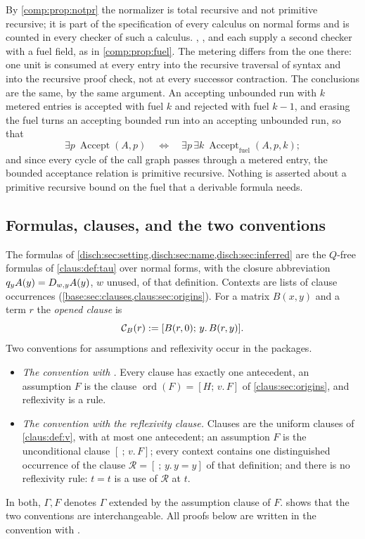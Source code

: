 \begin{remark}
\label{disch:rem:fuel}
By \cref{comp:prop:notpr} the normalizer is total recursive and not
primitive recursive; it is part of the specification of every calculus on
normal forms and is counted in every checker of such a calculus.
, , 
and  each supply a second checker with a fuel
field, as in \cref{comp:prop:fuel}. The metering differs from the one
there: one unit is consumed at every entry into the recursive traversal of
syntax and into the recursive proof check, not at every successor
contraction. The conclusions are the same, by the same argument. An
accepting unbounded run with $k$ metered entries is accepted with fuel $k$
and rejected with fuel $k-1$, and erasing the fuel turns an accepting
bounded run into an accepting unbounded run, so that
\[
 \exists p\ \operatorname{Accept}(A,p)
 \quad\Longleftrightarrow\quad
 \exists p\,\exists k\ \operatorname{Accept}_{\mathrm{fuel}}(A,p,k);
\]
and since every cycle of the call graph passes through a metered entry,
the bounded acceptance relation is primitive recursive. Nothing is
asserted about a primitive recursive bound on the fuel that a derivable
formula needs.
\end{remark}

\subsection{Formulas, clauses, and the two conventions}

The formulas of
\cref{disch:sec:setting,disch:sec:name,disch:sec:inferred} are the
$Q$-free formulas of \cref{claus:def:tau} over normal forms, with the
closure abbreviation $q_yA(y)=D_{w,y}A(y)$, $w$ unused, of that
definition. Contexts are lists of clause occurrences
(\cref{base:sec:clauses,claus:sec:origins}). For a matrix $B(x,y)$ and a
term $r$ the \emph{opened clause} is
\[
 \mathcal C_B(r)\mathrel{:=}[B(r,0);\,y.\,B(r,y)].
\]
Two conventions for assumptions and reflexivity occur in the packages.
\begin{itemize}
\item \emph{The convention with .} Every clause has exactly
 one antecedent, an assumption $F$ is the clause
 $\operatorname{ord}(F)=[H;\,v.\,F]$ of \cref{claus:sec:origins}, and
 reflexivity is a rule.
\item \emph{The convention with the reflexivity clause.} Clauses are the
 uniform clauses of \cref{claus:def:v}, with at most one antecedent; an
 assumption $F$ is the unconditional clause $[\ ;\,v.\,F]$; every context
 contains one distinguished occurrence of the clause
 $\mathcal R=[\ ;\,y.\,y=y]$ of that definition; and there is no
 reflexivity rule: $t=t$ is a use of $\mathcal R$ at $t$.
\end{itemize}
In both, $\Gamma,F$ denotes $\Gamma$ extended by the assumption clause of
$F$.  shows that the two conventions are
interchangeable. All proofs below are written in the convention with
.

